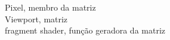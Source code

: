 \documentclass[preview]{standalone}
\begin{document}
Pixel, membro da matriz\\Viewport, matriz\\fragment shader, função geradora da matriz\\
\end{document}
